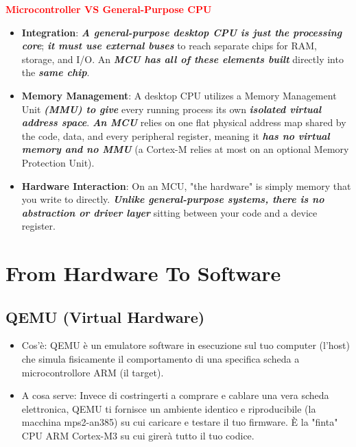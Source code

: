 \textbf{\textcolor{red}{Microcontroller VS General-Purpose CPU}}
\begin{itemize}
    \item \textbf{Integration}: \textbf{\textit{A general-purpose desktop CPU is just the processing core}}; \textbf{\textit{it must use external buses}} to reach separate chips for RAM, storage, and I/O. An \textbf{\textit{MCU has all of these elements built}} directly into the \textbf{\textit{same chip}}.   
    
    \item \textbf{Memory Management}: A desktop CPU utilizes a Memory Management Unit \textbf{\textit{(MMU) to give}} every running process its own \textbf{\textit{isolated virtual address space}}. \textbf{\textit{An MCU}} relies on one flat physical address map shared by the code, data, and every peripheral register, meaning it \textbf{\textit{has no virtual memory and no MMU}} (a Cortex-M relies at most on an optional Memory Protection Unit).   
    
    \item \textbf{Hardware Interaction}: On an MCU, "the hardware" is simply memory that you write to directly. \textbf{\textit{Unlike general-purpose systems, there is no abstraction or driver layer}} sitting between your code and a device register.
\end{itemize}

\section{From Hardware To Software}
\subsection{QEMU (Virtual Hardware)}
\begin{itemize}
    \item Cos'è: QEMU è un emulatore software in esecuzione sul tuo computer (l'host) che simula fisicamente il comportamento di una specifica scheda a microcontrollore ARM (il target).   
    
    \item A cosa serve: Invece di costringerti a comprare e cablare una vera scheda elettronica, QEMU ti fornisce un ambiente identico e riproducibile (la macchina mps2-an385) su cui caricare e testare il tuo firmware. È la "finta" CPU ARM Cortex-M3 su cui girerà tutto il tuo codice. 
\end{itemize}

